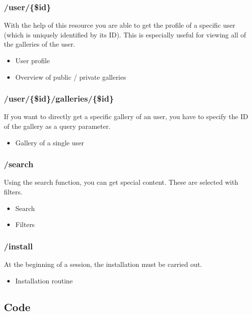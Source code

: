 \documentclass[a4paper,12pt,oneside]{article} %
\begin{document}
\subsubsection{/user/\{\$id\}}

With the help of this resource you are able to get the profile of
a specific user (which is uniquely identified by its ID). This is
especially useful for viewing all of the galleries of the user.
\begin{itemize}
\item User profile 
\item Overview of public / private galleries
\end{itemize}

\subsubsection{/user/\{\$id\}/galleries/\{\$id\}}

If you want to directly get a specific gallery of an user, you have
to specify the ID of the gallery as a query parameter.
\begin{itemize}
\item Gallery of a single user
\end{itemize}

\subsubsection{/search}

Using the search function, you can get special content. These are selected
with filters.
\begin{itemize}
\item Search
\item Filters
\end{itemize}

\subsubsection{/install}

At the beginning of a session, the installation must be carried out.
\begin{itemize}
\item Installation routine
\end{itemize}

\subsection{Code}
\end{document}
